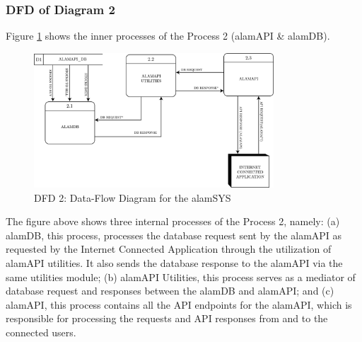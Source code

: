 \subsubsection{DFD of Diagram 2}
\label{subsubsec:dfd2}
Figure \ref{fig:dfd2} shows the inner processes of the Process 2 (alamAPI \& alamDB).
\begin{figure}[ht]
    \centering
    \includegraphics[width=0.80\textwidth]{./assets/Chapter_3/DFD/DFD_2.png}
    \caption{DFD 2: Data-Flow Diagram for the alamSYS}
    \label{fig:dfd2}
\end{figure}
\FloatBarrier


The figure above shows three internal processes of the Process 2, namely:
(a) alamDB, this process, processes the database request sent by the alamAPI as requested by the
Internet Connected Application through the utilization of alamAPI utilities. It also sends the database
response to the alamAPI via the same utilities module; 
(b) alamAPI Utilities, this process serves as a mediator of database request and responses
between the alamDB and alamAPI; and 
(c) alamAPI, this process contains all the API endpoints for the alamAPI, which is responsible
for processing the requests and API responses from and to the connected users.
\\